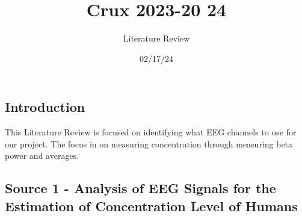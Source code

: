 \documentclass[a4paper]{article}
\title{Crux 2023-20 24}
\author{Literature Review}
\date{02/17/24}
\begin{document}
\maketitle


\subsection*{Introduction}

This Literature Review is focused on identifying what EEG channels to use for our project. The focus in on measuring concentration through measuring beta power and averages.

\subsection*{Source 1 - Analysis of EEG Signals for the Estimation of Concentration Level of Humans}
\end{document}

